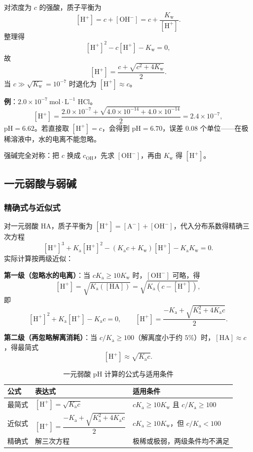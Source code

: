 \documentclass[UTF8]{ctexbook}
\begin{document}
对浓度为 $c$ 的强酸，质子平衡为
\[
[\mathrm{H^+}]=c+[\mathrm{OH^-}]=c+\frac{K_{\mathrm{w}}}{[\mathrm{H^+}]}.
\]
整理得
\[
[\mathrm{H^+}]^2-c[\mathrm{H^+}]-K_{\mathrm{w}}=0,
\]
故
\[
[\mathrm{H^+}]=\frac{c+\sqrt{c^2+4K_{\mathrm{w}}}}{2}.
\]
当 $c\gg\sqrt{K_{\mathrm{w}}}=10^{-7}$ 时退化为 $[\mathrm{H^+}]\approx c$。

\textbf{例}：$2.0\times10^{-7}\ \mathrm{mol\cdot L^{-1}}$ $\mathrm{HCl}$。
\[
[\mathrm{H^+}]=\frac{2.0\times10^{-7}+\sqrt{4.0\times10^{-14}+4.0\times10^{-14}}}{2}
=2.4\times10^{-7},
\]
$\mathrm{pH}=6.62$。若直接取 $[\mathrm{H^+}]=c$，会得到 $\mathrm{pH}=6.70$，误差 0.08 个单位——在极稀溶液中，水的电离不能忽略。

强碱完全对称：把 $c$ 换成 $c_{\mathrm{OH}}$，先求 $[\mathrm{OH^-}]$，再由 $K_{\mathrm{w}}$ 得 $[\mathrm{H^+}]$。

\subsection{一元弱酸与弱碱}

\subsubsection{精确式与近似式}

对一元弱酸 $\mathrm{HA}$，质子平衡为 $[\mathrm{H^+}]=[\mathrm{A^-}]+[\mathrm{OH^-}]$，代入分布系数得精确三次方程
\[
[\mathrm{H^+}]^3+K_{\mathrm{a}}[\mathrm{H^+}]^2-(K_{\mathrm{a}}c+K_{\mathrm{w}})[\mathrm{H^+}]-K_{\mathrm{a}}K_{\mathrm{w}}=0.
\]
实际计算按两级近似：

\textbf{第一级（忽略水的电离）}：当 $cK_{\mathrm{a}}\ge10K_{\mathrm{w}}$ 时，$[\mathrm{OH^-}]$ 可略，得
\[
[\mathrm{H^+}]=\sqrt{K_{\mathrm{a}}([\mathrm{HA}])}
=\sqrt{K_{\mathrm{a}}(c-[\mathrm{H^+}])},
\]
即
\[
[\mathrm{H^+}]^2+K_{\mathrm{a}}[\mathrm{H^+}]-K_{\mathrm{a}}c=0,
\qquad
[\mathrm{H^+}]=\frac{-K_{\mathrm{a}}+\sqrt{K_{\mathrm{a}}^2+4K_{\mathrm{a}}c}}{2}.
\]

\textbf{第二级（再忽略解离消耗）}：当 $c/K_{\mathrm{a}}\ge100$（解离度小于约 $5\%$）时，$[\mathrm{HA}]\approx c$，得最简式
\[
[\mathrm{H^+}]\approx\sqrt{K_{\mathrm{a}}c}.
\]

\begin{table}[H]
\centering
\caption{一元弱酸 $\mathrm{pH}$ 计算的公式与适用条件}
\begin{tabular}{p{3.4cm}p{5.6cm}p{5.0cm}}
\toprule
公式 & 表达式 & 适用条件 \\
\midrule
最简式 & $[\mathrm{H^+}]=\sqrt{K_{\mathrm{a}}c}$ & $cK_{\mathrm{a}}\ge10K_{\mathrm{w}}$ 且 $c/K_{\mathrm{a}}\ge100$ \\
近似式 & $[\mathrm{H^+}]=\dfrac{-K_{\mathrm{a}}+\sqrt{K_{\mathrm{a}}^2+4K_{\mathrm{a}}c}}{2}$ & $cK_{\mathrm{a}}\ge10K_{\mathrm{w}}$，但 $c/K_{\mathrm{a}}<100$ \\
精确式 & 解三次方程 & 极稀或极弱，两级条件均不满足 \\
\bottomrule
\end{tabular}
\end{table}
\end{document}
